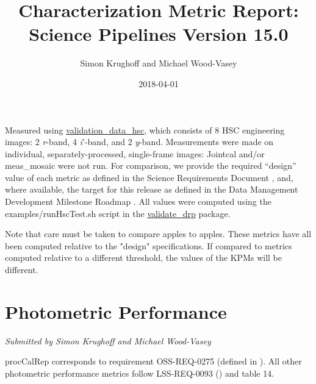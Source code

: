 \documentclass[DM,toc]{lsstdoc}
\title[V15.0 Characterization Report]{Characterization Metric Report: Science Pipelines Version 15.0}
\author{Simon Krughoff and Michael Wood-Vasey}
\date{2018-04-01}
\begin{document}
\maketitle

Measured using
\href{https://github.com/lsst/validation_data_hsc}{validation\_data\_hsc},
which consists of 8 HSC engineering images: 2 \emph{r}-band, 4
\emph{i}'-band, and 2 \emph{y}-band. Measurements were made on
individual, separately-processed, single-frame images: Jointcal and/or
meas\_mosaic were not run. For comparison, we provide the \SRD required
``design'' value of each metric as defined in the Science Requirements
Document , and, where available, the
target for this release as defined in the Data Management Development
Milestone Roadmap . All values
were computed using the examples/runHscTest.sh script in the
\href{https://github.com/lsst/validate_drp}{validate\_drp} package.

Note that care must be taken to compare apples to apples.  These metrics
have all been computed relative to the "design" specifications.  If compared
to metrics computed relative to a different threshold, the values of the KPMs
will be different.

\section{Photometric Performance}\label{photometric-performance}

\emph{Submitted by Simon Krughoff and Michael Wood-Vasey}

procCalRep corresponds to requirement OSS-REQ-0275 (defined in
). All other photometric performance
metrics follow LSS-REQ-0093 () and
 table 14.
\end{document}

